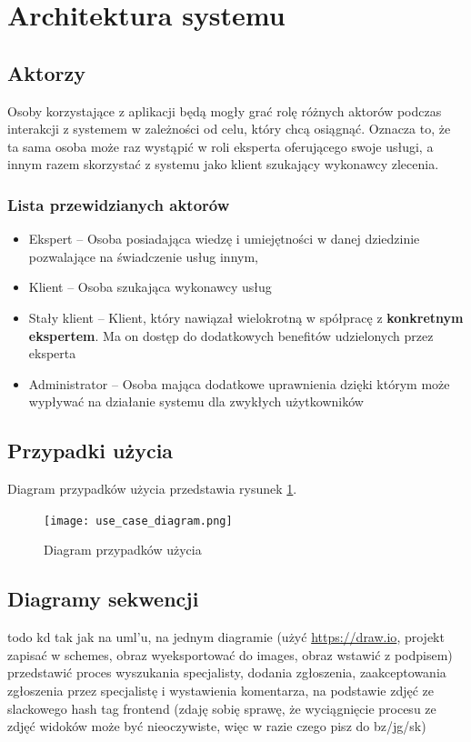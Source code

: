 \documentclass[10pt, titlepage, oneside, a4paper]{article}
\begin{document}
	\section{Architektura systemu}
  
  \subsection{Aktorzy}
	Osoby korzystające z aplikacji będą mogły grać rolę różnych aktorów podczas interakcji z systemem w zależności od celu, który chcą osiągnąć.
	Oznacza to, że ta sama osoba może raz wystąpić w roli eksperta oferującego swoje usługi, a innym razem skorzystać z systemu jako klient szukający wykonawcy zlecenia.

	\subsubsection*{Lista przewidzianych aktorów}
	\begin{itemize}
		\item Ekspert -- Osoba posiadająca wiedzę i umiejętności w danej dziedzinie pozwalające na świadczenie usług innym,
		\item Klient -- Osoba szukająca wykonawcy usług
		\item Stały klient -- Klient, który nawiązał wielokrotną w spółpracę z \textbf{konkretnym ekspertem}. Ma on dostęp do dodatkowych benefitów udzielonych przez eksperta
		\item Administrator -- Osoba mająca dodatkowe uprawnienia dzięki którym może wypływać na działanie systemu dla zwykłych użytkowników
	\end{itemize}
	
  \subsection{Przypadki użycia}
  Diagram przypadków użycia przedstawia rysunek \ref{fig:ucDiagram}.

  \begin{figure}[h]
	  \centering
	  \texttt{[image: use\_case\_diagram.png]}
	  \caption{Diagram przypadków użycia}
	  \label{fig:ucDiagram}
  \end{figure}
  
  \subsection{Diagramy sekwencji}
	todo kd tak jak na uml'u, na jednym diagramie (użyć \url{https://draw.io}, projekt zapisać w schemes, obraz wyeksportować do images, obraz wstawić z podpisem) przedstawić proces wyszukania specjalisty, dodania zgłoszenia, zaakceptowania zgłoszenia przez specjalistę i wystawienia komentarza, na podstawie zdjęć ze slackowego hash tag frontend (zdaję sobię sprawę, że wyciągnięcie procesu ze zdjęć widoków może być nieoczywiste, więc w razie czego pisz do bz/jg/sk)
	\newpage
  
\end{document}
